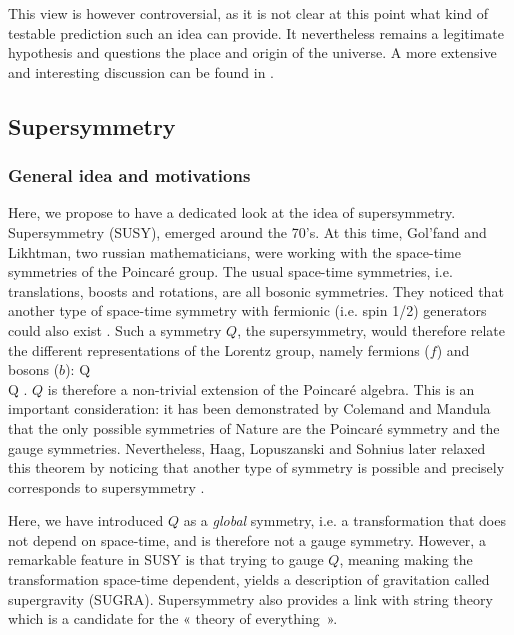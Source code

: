     This view is however controversial, as it is not clear at this point what
    kind of testable prediction such an idea can provide. It nevertheless
    remains a legitimate hypothesis and questions the place and origin of the
    universe. A more extensive and interesting discussion can be found in
    \cite{MultiversBarrau}.

    \subsection{Supersymmetry \label{sec:SUSY}}

    \subsubsection{General idea and motivations}

    Here, we propose to have a dedicated look at the idea of supersymmetry.
    Supersymmetry (SUSY), emerged around the 70's. At this time, Gol'fand and
    Likhtman, two russian mathematicians, were working with the space-time
    symmetries of the Poincaré group. The usual space-time symmetries, i.e.
    translations, boosts and rotations, are all bosonic symmetries. They noticed
    that another type of space-time symmetry with fermionic (i.e. spin 1/2)
    generators could also exist \cite{FirstSUSYPaper}.  Such a symmetry $Q$, the
    supersymmetry, would therefore relate the different representations of the
    Lorentz group, namely fermions ($f$) and bosons ($b$):
    {
        Q \rvert {} \rangle \rightarrow \rvert {} \rangle \nonumber
        \\
        Q \rvert {} \rangle \rightarrow \rvert {} \rangle.
    }
    $Q$ is therefore a non-trivial extension of the Poincaré algebra. This is an
    important consideration: it has been demonstrated by Colemand and Mandula
    \cite{ColemandMandula} that the only possible symmetries of Nature are the
    Poincaré symmetry and the gauge symmetries. Nevertheless, Haag, Lopuszanski
    and Sohnius later relaxed this theorem \cite{HaagLopuszanskiSohnius} by
    noticing that another type of symmetry is possible and precisely corresponds
    to supersymmetry \cite{SUSYPrimer, Dawson}.

    Here, we have introduced $Q$ as a \emph{global} symmetry, i.e. a
    transformation that does not depend on space-time, and is therefore not a
    gauge symmetry.  However, a remarkable feature in SUSY is that trying to
    gauge $Q$, meaning making the transformation space-time dependent, yields a
    description of gravitation called supergravity (SUGRA). Supersymmetry also
    provides a link with string theory which is a candidate for the « theory of
    everything\, ».

